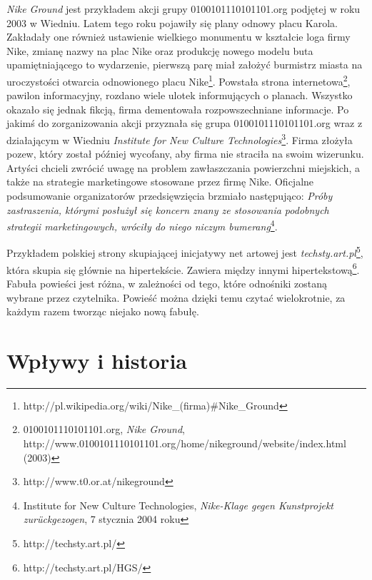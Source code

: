 \documentclass[a4paper,12pt,twoside]{article}
\begin{document}
\textit{Nike Ground} jest przykładem akcji grupy 
0100101110101101.org podjętej w roku 2003 w Wiedniu. Latem tego roku
pojawiły się plany odnowy placu Karola. Zakładały one również ustawienie
wielkiego monumentu w kształcie loga firmy Nike, zmianę nazwy na
plac Nike oraz produkcję nowego modelu buta upamiętniającego to wydarzenie,
pierwszą parę miał założyć burmistrz miasta na uroczystości otwarcia
odnowionego placu
Nike\footnote{http://pl.wikipedia.org/wiki/Nike\_(firma)\#Nike\_Ground}.
Powstała strona
internetowa\footnote{0100101110101101.org, \textit{Nike Ground}, 
http://www.0100101110101101.org/home/nikeground/website/index.html (2003)},
pawilon informacyjny, rozdano wiele ulotek informujących o planach.
Wszystko okazało się jednak fikcją, firma dementowała rozpowszechniane
informacje. Po jakimś do zorganizowania akcji przyznała się
grupa 0100101110101101.org wraz z działającym w Wiedniu \textit{Institute
for New Culture Technologies}\footnote{http://www.t0.or.at/nikeground}.
Firma złożyła pozew, który został później wycofany, aby firma nie straciła
na swoim wizerunku. Artyści chcieli zwrócić uwagę na problem zawłaszczania
powierzchni miejskich, a także na strategie marketingowe stosowane przez
firmę Nike. Oficjalne podsumowanie organizatorów przedsięwzięcia brzmiało
następująco: \textit{Próby zastraszenia, którymi posłużył się koncern znany
ze stosowania podobnych strategii marketingowych, wróciły do niego niczym
bumerang}\footnote{Institute for New Culture Technologies,
\textit{Nike-Klage gegen Kunstprojekt zurückgezogen}, 7 stycznia 2004 roku}.

Przykładem polskiej strony skupiającej inicjatywy net artowej jest
\textit{techsty.art.pl}\footnote{http://techsty.art.pl/},
która skupia się głównie na hipertekście. Zawiera między innymi
hipertekstową\footnote{http://techsty.art.pl/HGS/}. Fabuła powieści
jest różna, w zależności od tego, które odnośniki zostaną wybrane
przez czytelnika. Powieść można dzięki temu czytać wielokrotnie, za
każdym razem tworząc niejako nową fabułę.

\section{Wpływy i historia}
\end{document}
